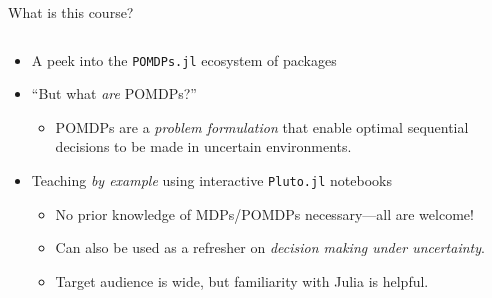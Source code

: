 \begin{frame}[fragile]{What is this course?}
\begin{columns}[T,onlytextwidth]
    \begin{column}{0.65\linewidth}
        {\footnotesize
        \begin{itemize}
            \item A peek into the \texttt{POMDPs.jl} ecosystem of \textbf{\large{\julialogo}} packages
            \item ``But what \textit{are} POMDPs?''
            {\footnotesize
            \begin{itemize}
                \item POMDPs are a \textit{problem formulation} that enable optimal\footnotemark{} sequential decisions to be made in uncertain environments.
            \end{itemize}}
            \item Teaching \textit{by example} using interactive \texttt{Pluto.jl} notebooks
            {\footnotesize
            \begin{itemize}
                \item No prior knowledge of MDPs/POMDPs necessary---all are welcome!
                \item Can also be used as a refresher on \textit{decision making under uncertainty}.
                \item Target audience is wide, but familiarity with Julia is helpful.
            \end{itemize}}
        \end{itemize}
        }
    \end{column}
\end{columns}
\end{frame}



